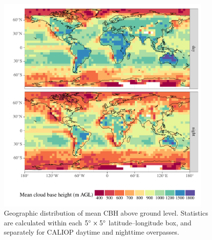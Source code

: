 \documentclass[essd,manuscript]{copernicus}\usepackage[]{graphicx}\usepackage[]{color}
\newenvironment{knitrout}{}{} %
\begin{document}
\begin{figure}
  \centering
\begin{knitrout}
\color{fgcolor}

{\centering \includegraphics[width=0.95\textwidth]{figure/method-cbase-base-1} 

}



\end{knitrout}
  \caption{Geographic distribution of mean CBH above ground
    level.  Statistics are calculated within each $5^{\circ}\times 5^{\circ}$
    latitude--longitude box, and separately for CALIOP daytime and nighttime
    overpasses.}
  \label{fig:geo}
\end{figure}

\end{document}
